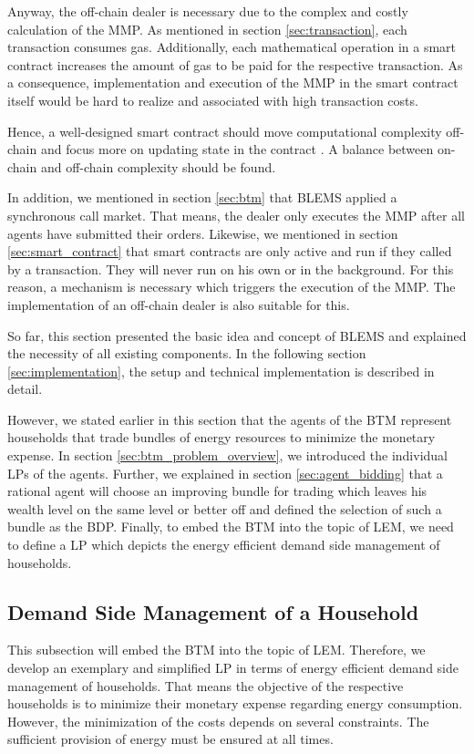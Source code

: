Anyway, the off-chain dealer is necessary due to the complex and costly calculation of the MMP.
As mentioned in section \ref{sec:transaction}, each transaction consumes gas. Additionally, each mathematical operation in a smart contract
increases the amount of gas to be paid for the respective transaction. As a consequence, implementation and execution of the MMP
in the smart contract itself would be hard to realize and associated with high transaction costs. 

Hence, a well-designed smart contract should move computational complexity off-chain
and focus more on updating state in the contract . A balance between on-chain
and off-chain complexity should be found.

In addition, we mentioned in section \ref{sec:btm} that BLEMS applied a synchronous
call market. That means, the dealer only executes the MMP after all agents have submitted their orders.
Likewise, we mentioned in section \ref{sec:smart_contract} that smart contracts are only active and run if they called by a transaction.
They will never run on his own or in the background. For this reason, a mechanism is necessary which triggers the execution of the 
MMP. The implementation of an off-chain dealer is also suitable for this.

So far, this section presented the basic idea and concept of BLEMS
and explained the necessity of all existing components. In the following section \ref{sec:implementation}, 
the setup and technical implementation is described in detail. 

However, we stated earlier in this section that the agents of the BTM represent households
that trade bundles of energy resources to minimize the monetary expense. 
In section \ref{sec:btm_problem_overview}, we introduced the individual LPs of the agents.
Further, we explained in section \ref{sec:agent_bidding} that a rational agent will choose an improving bundle for 
trading which leaves his wealth level on the same level or better off and defined the selection of such a bundle 
as the BDP.
Finally, to embed the BTM into the topic of LEM, we need to define 
a LP which depicts the energy efficient demand side management of households.

\subsection{Demand Side Management of a Household}
This subsection will embed the BTM into the topic of LEM. 
Therefore, we develop an exemplary and simplified LP in terms of energy efficient demand side management of households. 
That means the objective of the respective households is to minimize their monetary expense regarding energy consumption.
However, the minimization of the costs depends on several constraints.
The sufficient provision of energy must be ensured at all times.


